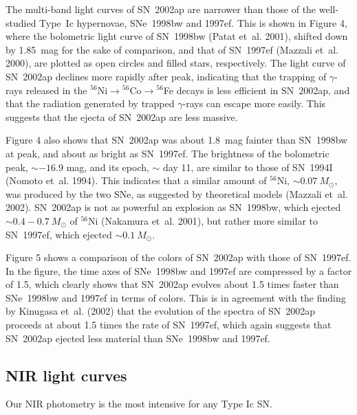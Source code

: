 \documentclass[10pt,preprint2]{aastex}
\def\sun{\odot}
\begin{document}
The multi-band light curves of SN~2002ap are narrower than those
of the well-studied Type~Ic hypernovae, SNe~1998bw and 1997ef.
This is shown in Figure 4, where the bolometric light curve of
SN~1998bw (Patat et~al. 2001), shifted down by 1.85~mag for the
sake of comparison, and that of SN~1997ef (Mazzali et~al. 2000),
are plotted as open circles and filled stars, respectively.
The light curve of SN~2002ap declines more rapidly after peak,
indicating that the trapping of $\gamma$-rays released in the
$^{56}$Ni$\rightarrow$$^{56}$Co$\rightarrow$$^{56}$Fe decays is
less efficient in SN~2002ap, and that the radiation generated by
trapped $\gamma$-rays can escape more easily.
This suggests that the ejecta of SN~2002ap are less massive.

Figure 4 also shows that SN~2002ap was about 1.8~mag fainter than
SN~1998bw at peak, and about as bright as SN~1997ef. The
brightness of the bolometric peak, $\sim -16.9$ mag, and its
epoch, $\sim$ day 11, are similar to those of SN~1994I (Nomoto
et~al. 1994). This indicates that a similar amount of $^{56}$Ni,
$\sim 0.07~M_\sun$, was produced by the two SNe, as suggested by
theoretical models (Mazzali et~al. 2002). SN~2002ap is not as
powerful an explosion as SN~1998bw, which ejected $\sim
0.4-0.7~M_\sun$ of $^{56}$Ni (Nakamura et~al. 2001), but rather
more similar to SN~1997ef, which ejected $\sim 0.1~M_\sun$.

Figure 5 shows a comparison of the colors of SN~2002ap with those
of SN~1997ef. In the figure, the time axes of SNe~1998bw and
1997ef are compressed by a factor of 1.5, which clearly shows that
SN~2002ap evolves about 1.5 times faster than SNe~1998bw and
1997ef in terms of colors. This is in agreement with the finding
by Kinugasa et~al. (2002) that the evolution of the spectra of
SN~2002ap proceeds at about 1.5 times the rate of SN~1997ef, which
again suggests that SN~2002ap ejected less material than
SNe~1998bw and 1997ef.

\subsection{NIR light curves}

Our NIR photometry is the most intensive for any Type Ic SN.
\end{document}
